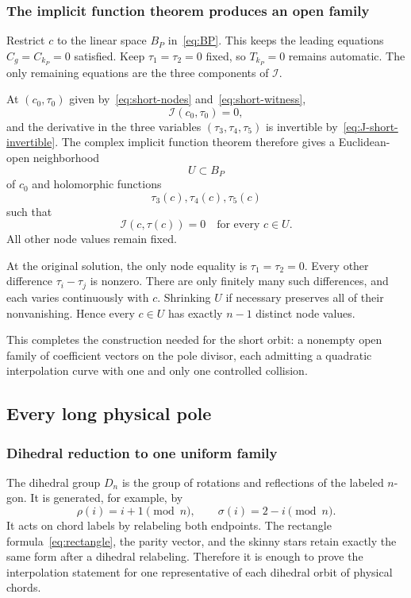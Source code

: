 \documentclass[11pt]{article}
\theoremstyle{definition}
\begin{document}
\subsubsection{The implicit function theorem produces an open family}

Restrict $c$ to the linear space $B_P$ in~\eqref{eq:BP}.  This keeps the leading equations $C_g=C_{k_P}=0$ satisfied.  Keep $\tau_1=\tau_2=0$ fixed, so $T_{k_P}=0$ remains automatic.  The only remaining equations are the three components of $\mathcal I$.

At $(c_0,\tau_0)$ given by~\eqref{eq:short-nodes} and~\eqref{eq:short-witness},
\[
\mathcal I(c_0,\tau_0)=0,
\]
and the derivative in the three variables $(\tau_3,\tau_4,\tau_5)$ is invertible by~\eqref{eq:J-short-invertible}.  The complex implicit function theorem therefore gives a Euclidean-open neighborhood
\begin{equation}
U\subset B_P
\label{eq:short-open-U}
\end{equation}
of $c_0$ and holomorphic functions
\[
\tau_3(c),\tau_4(c),\tau_5(c)
\]
such that
\[
\mathcal I(c,\tau(c))=0
\quad\text{for every }c\in U.
\]
All other node values remain fixed.

At the original solution, the only node equality is $\tau_1=\tau_2=0$.  Every other difference $\tau_i-\tau_j$ is nonzero.  There are only finitely many such differences, and each varies continuously with $c$.  Shrinking $U$ if necessary preserves all of their nonvanishing.  Hence every $c\in U$ has exactly $n-1$ distinct node values.

This completes the construction needed for the short orbit: a nonempty open family of coefficient vectors on the pole divisor, each admitting a quadratic interpolation curve with one and only one controlled collision.

\subsection{Every long physical pole}

\subsubsection{Dihedral reduction to one uniform family}

The dihedral group $D_n$ is the group of rotations and reflections of the labeled $n$-gon.  It is generated, for example, by
\[
\rho(i)=i+1\pmod n,
\qquad
\sigma(i)=2-i\pmod n.
\]
It acts on chord labels by relabeling both endpoints.  The rectangle formula~\eqref{eq:rectangle}, the parity vector, and the skinny stars retain exactly the same form after a dihedral relabeling.  Therefore it is enough to prove the interpolation statement for one representative of each dihedral orbit of physical chords.
\end{document}
